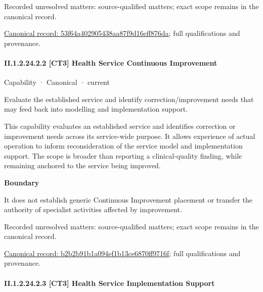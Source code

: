 {\small Recorded unresolved matters: source-qualified matters; exact scope remains in the canonical record.}\par
{\footnotesize \href{../../../../continuum/strategy/capability/53f64a402905438aa87f9d16eff876da.md}{Canonical record: 53f64a402905438aa87f9d16eff876da}; full qualifications and provenance.}\par
\paragraph*{II.1.2.24.2.2 [CT3] Health Service Continuous Improvement}
\label{navigation:II.1.2.24.2.2}

\label{element:b2b2b91b1a094ef1b13ce6870ff9716f}
{\small Capability · Canonical · current}\par

Evaluate the established service and identify correction/improvement needs that may feed back into modelling and implementation support.



This capability evaluates an established service and identifies correction or improvement needs across its service-wide purpose. It allows experience of actual operation to inform reconsideration of the service model and implementation support. The scope is broader than reporting a clinical-quality finding, while remaining anchored to the service being improved.



\textbf{Boundary}



It does not establish generic Continuous Improvement placement or transfer the authority of specialist activities affected by improvement.


{\small Recorded unresolved matters: source-qualified matters; exact scope remains in the canonical record.}\par
{\footnotesize \href{../../../../continuum/strategy/capability/b2b2b91b1a094ef1b13ce6870ff9716f.md}{Canonical record: b2b2b91b1a094ef1b13ce6870ff9716f}; full qualifications and provenance.}\par
\paragraph*{II.1.2.24.2.3 [CT3] Health Service Implementation Support}
\label{navigation:II.1.2.24.2.3}

